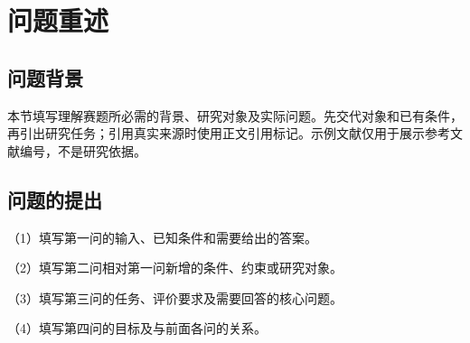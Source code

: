 \section{问题重述}
\subsection{问题背景}
本节填写理解赛题所必需的背景、研究对象及实际问题。先交代对象和已有条件，再引出研究任务；引用真实来源时使用正文引用标记。示例文献\cite{template-guide}仅用于展示参考文献编号，不是研究依据。

\subsection{问题的提出}
（1）填写第一问的输入、已知条件和需要给出的答案。

（2）填写第二问相对第一问新增的条件、约束或研究对象。

（3）填写第三问的任务、评价要求及需要回答的核心问题。

（4）填写第四问的目标及与前面各问的关系。

